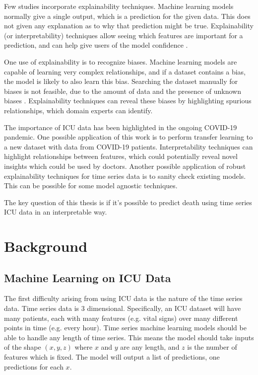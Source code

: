 \documentclass[12pt]{article}
\begin{document}
Few studies incorporate explainability techniques. Machine learning models normally give a single output, which is a prediction for the given data. This does not given any explanation as to why that prediction might be true. Explainability (or interpretability) techniques allow seeing which features are important for a prediction, and can help give users of the model confidence \cite{YoungKyle2019Dnno}.

One use of explainability is to recognize biases. Machine learning models are capable of learning very complex relationships, and if a dataset contains a bias, the model is likely to also learn this bias. Searching the dataset manually for biases is not feasible, due to the amount of data and the presence of unknown biases \cite{YoungKyle2019Dnno}. Explainability techniques can reveal these biases by highlighting spurious relationships, which domain experts can identify.

The importance of ICU data has been highlighted in the ongoing COVID-19 pandemic. One possible application of this work is to perform transfer learning to a new dataset with  data from COVID-19 patients. Interpretability techniques can highlight relationships between features, which could potentially reveal novel insights which could be used by doctors. Another possible application of robust explainability techniques for time series data is to sanity check existing models. This can be possible for some model agnostic techniques.

The key question of this thesis is if it's possible to predict death using time series ICU data in an interpretable way.

\section{Background}

\subsection{Machine Learning on ICU Data}
\label{Machine Learning on ICU Data}
The first difficulty arising from using ICU data is the nature of the time series data. Time series data is 3 dimensional. Specifically, an ICU dataset will have many patients, each with many features (e.g. vital signs) over many different points in time (e.g. every hour). Time series machine learning models should be able to handle any length of time series. This means the model should take inputs of the shape $(x,y,z)$ where $x$ and $y$ are any length, and $z$ is the number of features which is fixed. The model will output a list of predictions, one predictions for each $x$.
\end{document}
